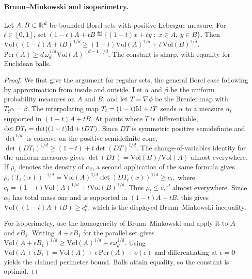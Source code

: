 \paragraph{Brunn--Minkowski and isoperimetry.}
\begin{prop}\label{prop-ot-brunn-minkowski-isoperimetric}
Let $A,B\subset\mathbb{R}^d$ be bounded Borel sets with positive Lebesgue measure. For $t\in[0,1]$, set
\((1-t)A+tB\eqdef\{(1-t)x+ty\;:\;x\in A,\ y\in B\}.\)
Then
\(\mathrm{Vol}((1-t)A+tB)^{1/d} \geq (1-t)\mathrm{Vol}(A)^{1/d} + t\,\mathrm{Vol}(B)^{1/d}.\)
\(\mathrm{Per}(A) \geq d\,\omega_d^{1/d}\mathrm{Vol}(A)^{(d-1)/d}.\)
The constant is sharp, with equality for Euclidean balls.
\end{prop}
\begin{proof}
We first give the argument for regular sets, the general Borel case following by approximation from inside and outside. Let $\alpha$ and $\beta$ be the uniform probability measures on $A$ and $B$, and let $T=\nabla\phi$ be the Brenier map with $T_\sharp\alpha=\beta$. The interpolating map $T_t=(1-t)\mathrm{Id}+tT$ sends $\alpha$ to a measure $\alpha_t$ supported in $(1-t)A+tB$. At points where $T$ is differentiable,
\(\det DT_t = \det((1-t)\mathrm{Id}+tDT)\).
Since $DT$ is symmetric positive semidefinite and $\det^{1/d}$ is concave on the positive semidefinite cone,
\(\det(DT_t)^{1/d} \geq (1-t)+t\det(DT)^{1/d}\).
The change-of-variables identity for the uniform measures gives $\det(DT)=\mathrm{Vol}(B)/\mathrm{Vol}(A)$ almost everywhere. If $\rho_t$ denotes the density of $\alpha_t$, a second application of the same formula gives
\(\rho_t(T_t(x))^{-1/d} = \mathrm{Vol}(A)^{1/d}\det(DT_t(x))^{1/d} \geq c_t,\)
where $c_t=(1-t)\mathrm{Vol}(A)^{1/d}+t\mathrm{Vol}(B)^{1/d}$. Thus $\rho_t\leq c_t^{-d}$ almost everywhere. Since $\alpha_t$ has total mass one and is supported in $(1-t)A+tB$, this gives $\mathrm{Vol}((1-t)A+tB)\geq c_t^d$, which is the displayed Brunn--Minkowski inequality.

For isoperimetry, use the homogeneity of Brunn--Minkowski and apply it to $A$ and $\epsilon B_1$. Writing $A+\epsilon B_1$ for the parallel set gives
\(\mathrm{Vol}(A+\epsilon B_1)^{1/d} \geq \mathrm{Vol}(A)^{1/d}+\epsilon\omega_d^{1/d}.\)
Using $\mathrm{Vol}(A+\epsilon B_1)=\mathrm{Vol}(A)+\epsilon\,\mathrm{Per}(A)+o(\epsilon)$ and differentiating at $\epsilon=0$ yields the claimed perimeter bound. Balls attain equality, so the constant is optimal.
\end{proof}
